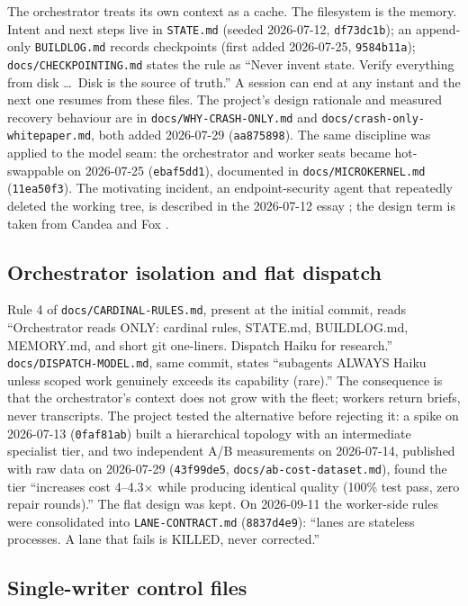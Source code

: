 \documentclass[11pt]{article}
\newcommand{\sha}[1]{\texttt{\small #1}}
\newcommand{\file}[1]{\texttt{\small #1}}
\begin{document}
The orchestrator treats its own context as a cache. The filesystem is the memory. Intent and next steps live in \file{STATE.md} (seeded 2026-07-12, \sha{df73dc1b}); an append-only \file{BUILDLOG.md} records checkpoints (first added 2026-07-25, \sha{9584b11a}); \file{docs/CHECKPOINTING.md} states the rule as ``Never invent state. Verify everything from disk \ldots\ Disk is the source of truth.'' A session can end at any instant and the next one resumes from these files. The project's design rationale and measured recovery behaviour are in \file{docs/WHY-CRASH-ONLY.md} and \file{docs/crash-only-whitepaper.md}, both added 2026-07-29 (\sha{aa875898}). The same discipline was applied to the model seam: the orchestrator and worker seats became hot-swappable on 2026-07-25 (\sha{ebaf5dd1}), documented in \file{docs/MICROKERNEL.md} (\sha{11ea50f3}). The motivating incident, an endpoint-security agent that repeatedly deleted the working tree, is described in the 2026-07-12 essay \cite{hypothesis}; the design term is taken from Candea and Fox \cite{candea2003}.

\subsection{Orchestrator isolation and flat dispatch}

Rule 4 of \file{docs/CARDINAL-RULES.md}, present at the initial commit, reads ``Orchestrator reads ONLY: cardinal rules, STATE.md, BUILDLOG.md, MEMORY.md, and short git one-liners. Dispatch Haiku for research.'' \file{docs/DISPATCH-MODEL.md}, same commit, states ``subagents ALWAYS Haiku unless scoped work genuinely exceeds its capability (rare).'' The consequence is that the orchestrator's context does not grow with the fleet; workers return briefs, never transcripts. The project tested the alternative before rejecting it: a spike on 2026-07-13 (\sha{0faf81ab}) built a hierarchical topology with an intermediate specialist tier, and two independent A/B measurements on 2026-07-14, published with raw data on 2026-07-29 (\sha{43f99de5}, \file{docs/ab-cost-dataset.md}), found the tier ``increases cost 4--4.3$\times$ while producing identical quality (100\% test pass, zero repair rounds).'' The flat design was kept. On 2026-09-11 the worker-side rules were consolidated into \file{LANE-CONTRACT.md} (\sha{8837d4e9}): ``lanes are stateless processes. A lane that fails is KILLED, never corrected.''

\subsection{Single-writer control files}
\end{document}
